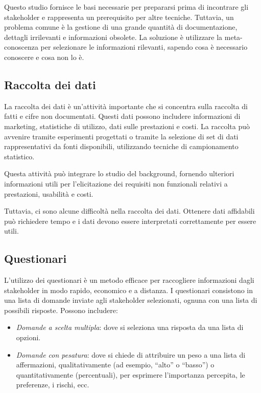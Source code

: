 Questo studio fornisce le basi necessarie per prepararsi prima di incontrare
gli stakeholder e rappresenta un prerequisito per altre tecniche. Tuttavia,
un problema comune è la gestione di una grande quantità di documentazione,
dettagli irrilevanti e informazioni obsolete. La soluzione è utilizzare la
meta-conoscenza per selezionare le informazioni rilevanti, sapendo cosa è
necessario conoscere e cosa non lo è.

\subsection{Raccolta dei dati}

La raccolta dei dati è un'attività importante che si concentra sulla raccolta
di fatti e cifre non documentati. Questi dati possono includere informazioni
di marketing, statistiche di utilizzo, dati sulle prestazioni e costi. La
raccolta può avvenire tramite esperimenti progettati o tramite la selezione
di set di dati rappresentativi da fonti disponibili, utilizzando tecniche di
campionamento statistico.

Questa attività può integrare lo studio del background, fornendo ulteriori
informazioni utili per l'elicitazione dei requisiti non funzionali relativi
a prestazioni, usabilità e costi.

Tuttavia, ci sono alcune difficoltà nella raccolta dei dati. Ottenere dati
affidabili può richiedere tempo e i dati devono essere interpretati
correttamente per essere utili.
\subsection{Questionari}

L'utilizzo dei questionari è un metodo efficace per raccogliere informazioni
dagli stakeholder in modo rapido, economico e a distanza. I questionari
consistono in una lista di domande inviate agli stakeholder selezionati,
ognuna con una lista di possibili risposte. Possono includere:

\begin{itemize}
    \item \textit{Domande a scelta multipla}: dove si seleziona una risposta
    da una lista di opzioni.
    \item \textit{Domande con pesatura}: dove si chiede di attribuire un peso
    a una lista di affermazioni, qualitativamente (ad esempio, ``alto'' o ``basso'')
    o quantitativamente (percentuali), per esprimere l'importanza percepita,
    le preferenze, i rischi, ecc.
\end{itemize}

